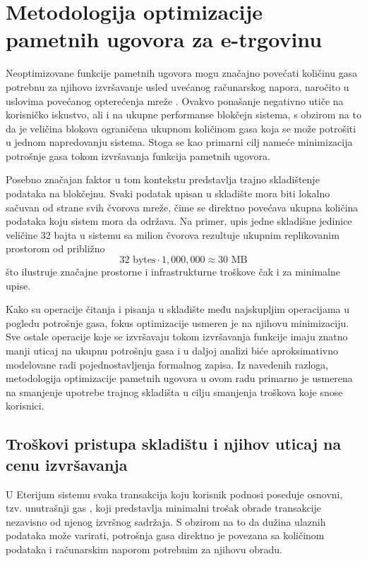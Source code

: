 \chapter{Metodologija optimizacije pametnih ugovora za e-trgovinu}
Neoptimizovane funkcije pametnih ugovora mogu značajno povećati količinu gasa potrebnu za njihovo izvršavanje usled uvećanog računarskog napora, naročito u uslovima povećanog opterećenja mreže \cite{chen2017under}. Ovakvo ponašanje negativno utiče na korisničko iskustvo, ali i na ukupne performanse blokčejn sistema, s obzirom na to da je veličina blokova ograničena ukupnom količinom gasa koja se može potrošiti u jednom napredovanju sistema. Stoga se kao primarni cilj nameće minimizacija potrošnje gasa tokom izvršavanja funkcija pametnih ugovora.

Posebno značajan faktor u tom kontekstu predstavlja trajno skladištenje podataka na blokčejnu. Svaki podatak upisan u skladište mora biti lokalno sačuvan od strane svih čvorova mreže, čime se direktno povećava ukupna količina podataka koju sistem mora da održava. Na primer, upis jedne skladišne jedinice veličine 32 bajta u sistemu sa milion čvorova rezultuje ukupnim replikovanim prostorom od približno
$$ 32 \text{ bytes} \cdot 1{,}000{,}000 \approx 30 \text{ MB} $$
što ilustruje značajne prostorne i infrastrukturne troškove čak i za minimalne upise.

Kako su operacije čitanja i pisanja u skladište među najskupljim operacijama u pogledu potrošnje gasa, fokus optimizacije usmeren je na njihovu minimizaciju. Sve ostale operacije koje se izvršavaju tokom izvršavanja funkcije imaju znatno manji uticaj na ukupnu potrošnju gasa i u daljoj analizi biće aproksimativno modelovane radi pojednostavljenja formalnog zapisa. Iz navedenih razloga, metodologija optimizacije pametnih ugovora u ovom radu primarno je usmerena na smanjenje upotrebe trajnog skladišta u cilju smanjenja troškova koje snose korisnici.

\section{Troškovi pristupa skladištu i njihov uticaj na cenu izvršavanja}
U Eterijum sistemu svaka transakcija koju korisnik podnosi poseduje osnovni, tzv. unutrašnji gas , koji predstavlja minimalni trošak obrade transakcije nezavisno od njenog izvršnog sadržaja. S obzirom na to da dužina ulaznih podataka može varirati, potrošnja gasa direktno je povezana sa količinom podataka i računarskim naporom potrebnim za njihovu obradu.

